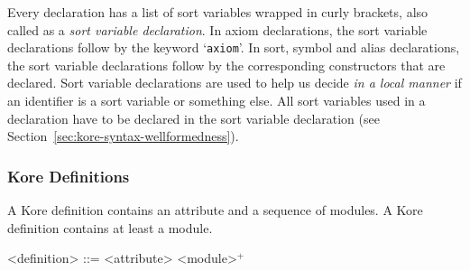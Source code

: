 \documentclass[UTF8,11pt]{article}
\theoremstyle{plain}
\theoremstyle{definition}
\theoremstyle{remark}
\begin{document}
Every declaration has a list of sort variables wrapped in curly brackets, also 
called as a \emph{sort variable declaration}.
In axiom declarations, the sort variable declarations follow by the 
keyword `\texttt{axiom}'.
In sort, symbol and alias declarations, the sort variable declarations follow 
by the corresponding constructors that are declared.
Sort variable declarations are used to help us decide \emph{in a local manner} 
if an identifier is a sort variable or something else.
All sort variables used in a declaration have to be declared in the sort 
variable declaration (see Section~\ref{sec:kore-syntax-wellformedness}).

\subsubsection{Kore Definitions}

A Kore definition contains an attribute and a sequence of modules.
A Kore definition contains at least a module.

\begin{grammar}\small
<definition> ::= <attribute> <module>$^+$
\end{grammar}
\end{document}
